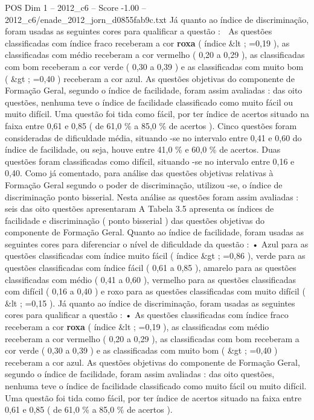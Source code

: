 \begin{textsample}{POS Dim 1 – 2012\_c6 – Score -1.00 – 2012\_c6/enade\_2012\_jorn\_d0855fab9c.txt}
Já quanto ao índice de discriminação, foram usadas as seguintes cores para qualificar a questão :  As questões classificadas com índice fraco receberam a cor \textbf{roxa} ( índice \&lt ; =0,19 ), as classificadas com médio receberam a cor vermelho ( 0,20 a 0,29 ), as classificadas com bom receberam a cor verde ( 0,30 a 0,39 ) e as classificadas com muito bom ( \&gt ; =0,40 ) receberam a cor azul.
As questões objetivas do componente de Formação Geral, segundo o índice de facilidade, foram assim avaliadas : das oito questões, nenhuma teve o índice de facilidade classificado como muito fácil ou muito difícil.
Uma questão foi tida como fácil, por ter índice de acertos situado na faixa entre 0,61 e 0,85 ( de 61,0 \% a 85,0 \% de acertos ).
Cinco questões foram consideradas de dificuldade média, situando -se no intervalo entre 0,41 e 0,60 do índice de facilidade, ou seja, houve entre 41,0 \% e 60,0 \% de acertos.
Duas questões foram classificadas como difícil, situando -se no intervalo entre 0,16 e 0,40.
Como já comentado, para análise das questões objetivas relativas à Formação Geral segundo o poder de discriminação, utilizou -se, o índice de discriminação ponto bisserial.
Nesta análise as questões foram assim avaliadas : seis das oito questões apresentaram A Tabela 3.5 apresenta os índices de facilidade e discriminação ( ponto bisserial ) das questões objetivas do componente de Formação Geral.
Quanto ao índice de facilidade, foram usadas as seguintes cores para diferenciar o nível de dificuldade da questão : • Azul para as questões classificadas com índice muito fácil ( índice \&gt ; =0,86 ), verde para as questões classificadas com índice fácil ( 0,61 a 0,85 ), amarelo para as questões classificadas com médio ( 0,41 a 0,60 ), vermelho para as questões classificadas com difícil ( 0,16 a 0,40 ) e roxo para as questões classificadas com muito difícil ( \&lt ; =0,15 ).
Já quanto ao índice de discriminação, foram usadas as seguintes cores para qualificar a questão : • As questões classificadas com índice fraco receberam a cor \textbf{roxa} ( índice \&lt ; =0,19 ), as classificadas com médio receberam a cor vermelho ( 0,20 a 0,29 ), as classificadas com bom receberam a cor verde ( 0,30 a 0,39 ) e as classificadas com muito bom ( \&gt ; =0,40 ) receberam a cor azul.
As questões objetivas do componente de Formação Geral, segundo o índice de facilidade, foram assim avaliadas : das oito questões, nenhuma teve o índice de facilidade classificado como muito fácil ou muito difícil.
Uma questão foi tida como fácil, por ter índice de acertos situado na faixa entre 0,61 e 0,85 ( de 61,0 \% a 85,0 \% de acertos ).

\end{textsample}
